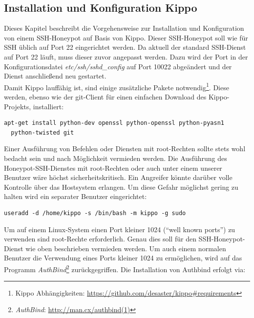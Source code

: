 \subsection{Installation und Konfiguration Kippo}
\label{subsec:Installation und Konfiguration Kippo}



Dieses Kapitel beschreibt die Vorgehensweise zur Installation und Konfiguration von einem SSH-Honeypot auf Basis von Kippo. Dieser SSH-Honeypot soll wie für SSH üblich auf Port 22 eingerichtet werden. Da aktuell der standard SSH-Dienst auf Port 22 läuft, muss dieser zuvor angepasst werden. Dazu wird der Port in der Konfigurationsdatei \textit{etc/ssh/sshd\_config} auf Port 10022 abgeändert und der Dienst anschließend neu gestartet.\\

Damit Kippo lauffähig ist, sind einige zusätzliche Pakete notwendig\footnote{ Kippo Abhängigkeiten: \url{https://github.com/desaster/kippo\#requirements}}. Diese werden, ebenso wie der git-Client für einen einfachen Download des Kippo-Projekts, installiert:

\begin{lstlisting}[style=customc]
apt-get install python-dev openssl python-openssl python-pyasn1 
  python-twisted git
\end{lstlisting}

Einer Ausführung von Befehlen oder Diensten mit root-Rechten sollte stets wohl bedacht sein und nach Möglichkeit vermieden werden. Die Ausführung des Honeypot-SSH-Dienstes mit root-Rechten oder auch unter einem unserer Benutzer wäre höchst sicherheitskritisch. Ein Angreifer könnte darüber volle Kontrolle über das Hostsystem erlangen. Um diese Gefahr möglichst gering zu halten wird ein separater Benutzer eingerichtet:

\begin{lstlisting}[style=customc]
useradd -d /home/kippo -s /bin/bash -m kippo -g sudo
\end{lstlisting}

Um auf einem Linux-System einen Port kleiner 1024 ("`well known ports"') zu verwenden sind root-Rechte erforderlich. Genau dies soll für den SSH-Honeypot-Dienst wie oben beschrieben vermieden werden. Um auch einem normalen Benutzer die Verwendung eines Ports kleiner 1024 zu ermöglichen, wird auf das Programm \textit{AuthBind}\footnote{ \textit{AuthBind}: \url{http://man.cx/authbind(1)}} zurückgegriffen. Die Installation von Authbind erfolgt via:


